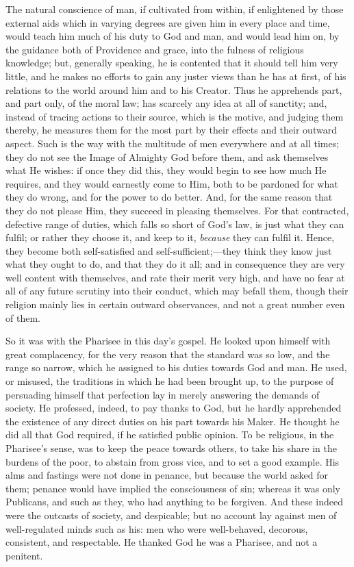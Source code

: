 The natural conscience of man, if cultivated from
within, if enlightened by those external aids which in
varying degrees are given him in every place and time,
would teach him much of his duty to God and man, and
would lead him on, by the guidance both of Providence and
grace, into the fulness of religious knowledge; but,
generally speaking, he is contented that it should tell
him very little, and he makes no efforts to gain any juster views than he has at first, of his relations to
the world around him and to his Creator. Thus he
apprehends part, and part only, of the moral law; has
scarcely any idea at all of sanctity; and, instead of
tracing actions to their source, which is the motive, and
judging them thereby, he measures them for the most part
by their effects and their outward aspect. Such is the
way with the multitude of men everywhere and at all
times; they do not see the Image of Almighty God before
them, and ask themselves what He wishes: if once they did
this, they would begin to see how much He requires, and
they would earnestly come to Him, both to be pardoned for
what they do wrong, and for the power to do better. And,
for the same reason that they do not please Him, they
succeed in pleasing themselves. For that contracted,
defective range of duties, which falls so short of God's
law, is just what they can fulfil; or rather they choose
it, and keep to it, \emph{because} they can fulfil it.
Hence, they become both self-satisfied and
self-sufficient;—they think they know just what they
ought to do, and that they do it all; and in consequence
they are very well content with themselves, and rate
their merit very high, and have no fear at all of any
future scrutiny into their conduct, which may befall
them, though their religion mainly lies in certain
outward observances, and not a great number even of them.

So it was with the Pharisee in this day's gospel. He
looked upon himself with great complacency, for the very
reason that the standard was so low, and the range so
narrow, which he assigned to his duties towards God and
man. He used, or misused, the traditions in which he had
been brought up, to the purpose of persuading himself
that perfection lay in merely answering the demands of
society. He professed, indeed, to pay thanks to God, but
he hardly apprehended the existence of any direct duties
on his part towards his Maker. He thought he did all that
God required, if he satisfied public opinion. To be
religious, in the Pharisee's sense, was to keep the peace
towards others, to take his share in the burdens of the
poor, to abstain from gross vice, and to set a good
example. His alms and fastings were not done in penance,
but because the world asked for them; penance would have
implied the consciousness of sin; whereas it was only
Publicans, and such as they, who had anything to be
forgiven. And these indeed were the outcasts of society,
and despicable; but no account lay against men of
well-regulated minds such as his: men who were
well-behaved, decorous, consistent, and respectable. He
thanked God he was a Pharisee, and not a penitent.

